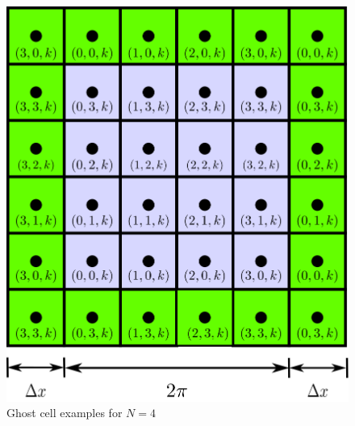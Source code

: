 \begin{figure}[H]
    \includegraphics[height=0.35\textheight]{media/rk4/periodic-BCs}
    \caption{Ghost cell examples for $N=4$}
    \label{fig:ghost-cell-example}
\end{figure}

